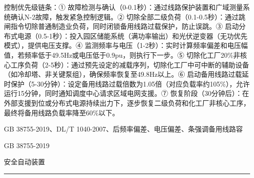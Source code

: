\documentclass[12pt,a4paper]{ctexart}
\begin{document}
\begin{description}[leftmargin=1.5em,style=nextline,font=\normalfont]
控制优先级链条：① 故障检测与确认（0-0.1秒）：通过线路保护装置和广域测量系统确认N-2故障，触发紧急控制逻辑。② 切除全部二级负荷（0.1-0.5秒）：通过跳闸指令切除普通制造业负荷，同时闭锁备用线路过载保护，防止误跳。③ 启动分布式电源（0.5-1秒）：投入园区储能系统（满功率输出）和光伏逆变器（无功优先模式），提供电压支撑。④ 监测频率与电压（1-2秒）：实时计算频率偏差和电压幅值，若频率低于49.5Hz或电压低于0.9pu，则执行下一步。⑤ 切除化工厂20\%非核心工序负荷（2-5秒）：通过预先设定的减载序列，切除化工厂中可中断的辅助设备（如冷却塔、非关键泵组），确保频率恢复至49.8Hz以上。⑥ 启动备用线路过载延时保护（5-30分钟）：设定备用线路过载倍数为1.05倍（对应负载率约105\%），允许运行15分钟，同时通知调度中心请求区域电网支援。⑦ 恢复阶段（30分钟后）：在外部支援到位或分布式电源持续出力下，逐步恢复二级负荷和化工厂非核心工序，最终将备用线路负载率降至60\%以下。
  \item[KW:] GB 38755-2019、DL/T 1040-2007、后频率偏差、电压偏差、条强调备用线路容
  \item[Std:] GB 38755-2019
  \item[Topic:] 安全自动装置
\end{description}
\vspace{4pt}
\hrule\vspace{6pt}
\end{document}
